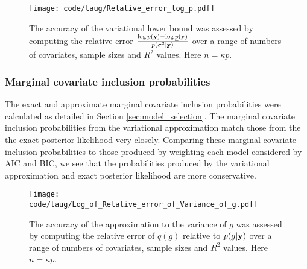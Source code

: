 \documentclass{amsart}[12pt]
\begin{document}
\begin{figure}[p]
	\texttt{[image: code/taug/Relative\_error\_log\_p.pdf]}
	\caption{The accuracy of the variational lower bound was assessed by computing the relative error
		$\frac{\log p({\bf y}) - \log \underline{p}({\bf y})}{p(\sigma^2 | {\bf y})}$ over a range
		of numbers of covariates, sample sizes and $R^2$  values. Here $n = \kappa p$.}
	\label{fig:relative_error}
\end{figure}




\subsubsection{Marginal covariate inclusion probabilities}

The exact and approximate marginal covariate inclusion probabilities were calculated as detailed in Section
\ref{sec:model_selection}. The marginal covariate inclusion probabilities from the variational approximation
match those from the the exact posterior likelihood very closely. Comparing these marginal covariate inclusion
probabilities to those produced by weighting each model considered by AIC and BIC, we see that the
probabilities produced by the variational approximation and exact posterior likelihood are more conservative.

\begin{figure}[p]
	\texttt{[image: code/taug/Log\_of\_Relative\_error\_of\_Variance\_of\_g.pdf]}
	\caption{The accuracy of the approximation to the variance of $g$ was assessed by computing the relative
		error of $q(g)$ relative to $p(g | {\bf y})$ over a range
		of numbers of covariates, sample sizes and $R^2$  values. Here $n = \kappa p$.}
	\label{fig:rel_error_var_g}
\end{figure}
\end{document}
